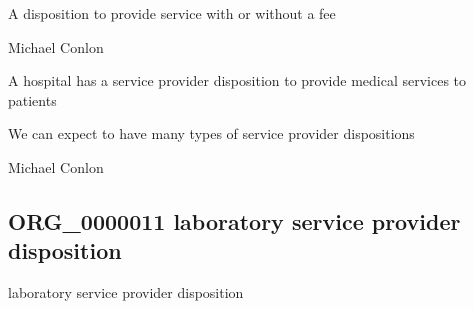 \documentclass[letterpaper,10pt,english]{sphinxmanual}
\begin{document}
\begin{sphinxShadowBox}

\sphinxAtStartPar
{\hyperref[\detokenize{doc-BFO_0000016::doc}]{}}
\end{sphinxShadowBox}

\begin{sphinxShadowBox}

\sphinxAtStartPar
A disposition to provide service with or without a fee
\end{sphinxShadowBox}

\begin{sphinxShadowBox}

\sphinxAtStartPar
Michael Conlon 
\end{sphinxShadowBox}

\begin{sphinxShadowBox}

\sphinxAtStartPar
A hospital has a service provider disposition to provide medical services to patients
\end{sphinxShadowBox}

\begin{sphinxShadowBox}

\sphinxAtStartPar
We can expect to have many types of service provider dispositions
\end{sphinxShadowBox}

\begin{sphinxShadowBox}

\sphinxAtStartPar
Michael Conlon 
\end{sphinxShadowBox}
\begin{quote}

\ignorespaces \end{quote}


\subsection{ORG\_0000011 \sphinxhyphen{} laboratory service provider disposition}
\label{\detokenize{doc-ORG_0000011:org-0000011-laboratory-service-provider-disposition}}\label{\detokenize{doc-ORG_0000011:index-0}}\label{\detokenize{doc-ORG_0000011::doc}}
\begin{sphinxShadowBox}

\sphinxAtStartPar
laboratory service provider disposition
\end{sphinxShadowBox}
\end{document}
